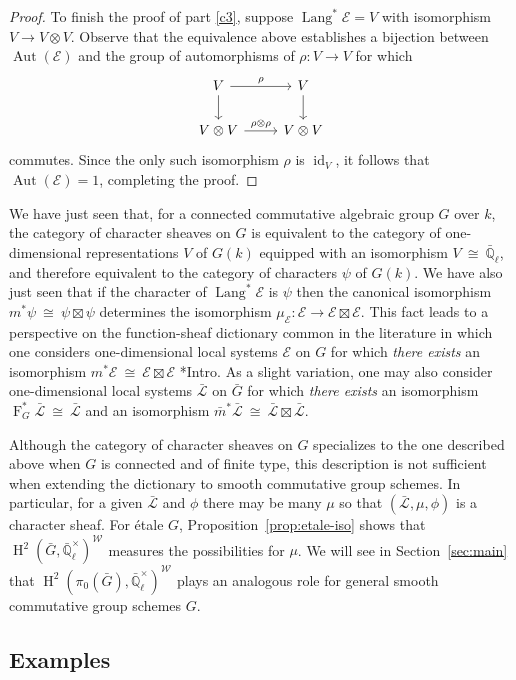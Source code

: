 \documentclass[10pt]{amsart}
\theoremstyle{plain}
\theoremstyle{definition}
\theoremstyle{remark}
\newcommand{\EE}{\mathbb{\bar Q}_\ell}
\newcommand{\Fq}{k}
\newcommand{\EEx}{\EE^\times}
\newcommand{\Weil}[1]{\mathcal{W}_{#1}}
\newcommand{\Frob}[1]{\operatorname{F}_{#1}}
\DeclareMathOperator{\Aut}{Aut}
\DeclareMathOperator{\id}{id}
\DeclareMathOperator{\Hh}{H}
\DeclareMathOperator{\Lang}{Lang}
\newcommand{\iso}{{\ \cong\ }}
\newcommand{\cs}[1]{{\mathcal{#1}}}
\newcommand{\gcs}[1]{{\mathcal{\bar #1}}}
\newcommand{\bm}{\bar{m}}
\newcommand{\bG}{\bar{G}}
\begin{document}
\begin{proof}
To finish the proof of part \ref{c3}, suppose $\Lang^*\cs{E} = V$ with isomorphism $V \to V\otimes V$.  Observe that the equivalence above establishes a bijection between $\Aut(\cs{E})$ and the group of automorphisms of $\rho : V\to V$ for which 
\[
\begin{tikzcd}
\arrow{d}{} V \arrow{r}{\rho} & V\arrow{d}{}\\
V\otimes V \arrow{r}{\rho\otimes \rho} & V\otimes V
\end{tikzcd}
\]
commutes. 
Since the only such isomorphism $\rho$ is $\id_V$, it follows that $\Aut(\cs{E}) = 1$, completing the proof.
\end{proof}

We have just seen that, for a connected commutative algebraic group $G$ over $\Fq$, the category of character sheaves on $G$ is equivalent to the category of one-dimensional representations $V$ of $G(\Fq)$ equipped with an isomorphism $V\iso \EE$, and therefore equivalent to the category of characters $\psi$ of $G(\Fq)$.
We have also just seen that if the character of $\Lang^*\cs{E}$ is $\psi$ then the canonical isomorphism $m^*\psi \iso \psi \boxtimes \psi$ determines the isomorphism $\mu_\cs{E} : \cs{E} \to \cs{E}\boxtimes\cs{E}$.
This fact leads to a perspective on the function-sheaf dictionary common in the literature in which one considers one-dimensional local systems $\cs{E}$ on $G$ for which \emph{there exists} an isomorphism $m^*\cs{E} \iso \cs{E} \boxtimes\cs{E}$ \cite{kamgarpour:09a}*{Intro}.
As a slight variation, one may also consider one-dimensional local systems $\gcs{L}$ on $\bG$ for which \emph{there exists} an isomorphism $\Frob{G}^*\gcs{L} \iso \gcs{L}$ and an isomorphism $\bm^*\gcs{L} \iso \gcs{L} \boxtimes\gcs{L}$.

Although the category of character sheaves on $G$ specializes to the one described above when $G$ is connected and of finite type, this description is not sufficient when extending the dictionary to smooth commutative group schemes. 
In particular, for a given $\gcs{L}$ and $\phi$ there may be many $\mu$ so that $(\gcs{L},\mu,\phi)$ is a character sheaf.  For \'etale $G$, Proposition~\ref{prop:etale-iso} shows that $\Hh^2(\bG,\EEx)^{\Weil{}}$ measures the possibilities for $\mu$.  We will see in Section~\ref{sec:main} that $\Hh^2(\pi_0(\bG),\EEx)^{\Weil{}}$ plays an analogous role for general smooth commutative group schemes $G$.

\subsection{Examples}
\end{document}
